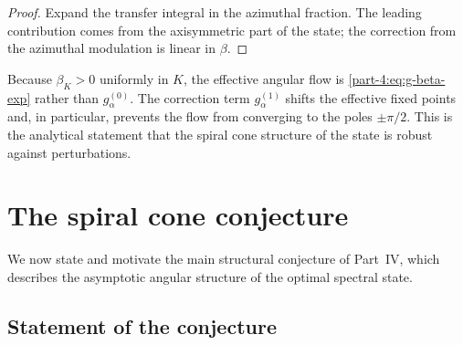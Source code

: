 \begin{proof}
Expand the transfer integral in the azimuthal fraction. The leading 
contribution comes from the axisymmetric part of the state; the 
correction from the azimuthal modulation is linear in $\beta$.
\end{proof}

\begin{remark}\label{part-4:rem:spiral-alpha}
Because $\beta_K>0$ uniformly in $K$, the effective angular flow is 
\eqref{part-4:eq:g-beta-exp} rather than $g_\alpha^{(0)}$. The correction 
term $g_\alpha^{(1)}$ shifts the effective fixed points and, in 
particular, prevents the flow from converging to the poles 
$\pm\pi/2$. This is the analytical statement that the spiral cone 
structure of the state is robust against perturbations.
\end{remark}

\section{The spiral cone conjecture}
\label{part-4:sec:cone}

We now state and motivate the main structural conjecture of Part~IV, 
which describes the asymptotic angular structure of the optimal 
spectral state.

\subsection{Statement of the conjecture}
\label{part-4:ssec:cone-statement}

